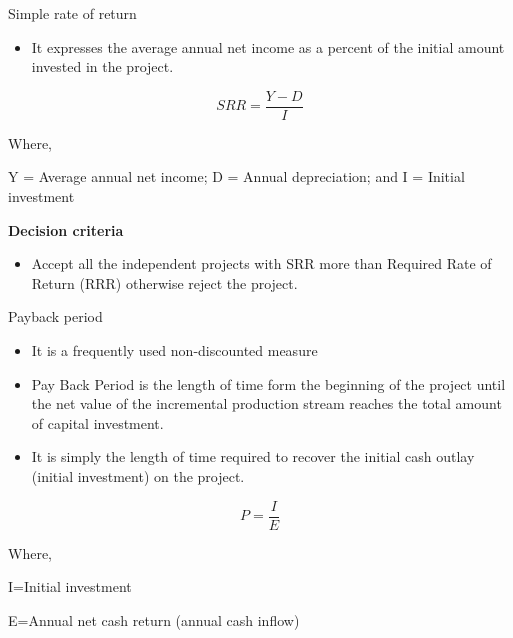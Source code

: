 \documentclass[12pt,ignorenonframetext,aspectratio=169]{beamer}
\providecommand{\tightlist}{%
  \setlength{\itemsep}{0pt}\setlength{\parskip}{0pt}}
\begin{document}
\begin{frame}{Simple rate of return}
\protect\hypertarget{simple-rate-of-return}{}
\footnotesize

\begin{itemize}
\tightlist
\item
  It expresses the average annual net income as a percent of the initial
  amount invested in the project.
\end{itemize}

\[
SRR = \frac{Y-D}{I}
\]

Where,

Y = Average annual net income; D = Annual depreciation; and I = Initial
investment

\textbf{Decision criteria}

\begin{itemize}
\tightlist
\item
  Accept all the independent projects with SRR more than Required Rate
  of Return (RRR) otherwise reject the project.
\end{itemize}
\end{frame}

\begin{frame}{Payback period}
\protect\hypertarget{payback-period}{}
\footnotesize

\begin{itemize}
\tightlist
\item
  It is a frequently used non-discounted measure
\item
  Pay Back Period is the length of time form the beginning of the
  project until the net value of the incremental production stream
  reaches the total amount of capital investment.
\item
  It is simply the length of time required to recover the initial cash
  outlay (initial investment) on the project.
\end{itemize}

\[
P=\frac{I}{E}
\]

Where,

I=Initial investment

E=Annual net cash return (annual cash inflow)
\end{frame}
\end{document}
